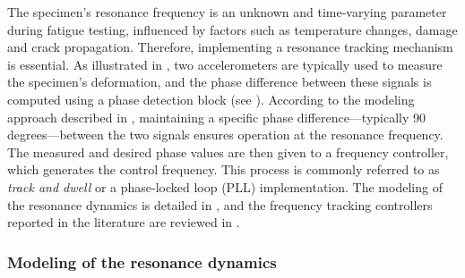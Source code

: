 \documentclass[lettersize,journal]{IEEEtran}
\begin{document}
The specimen’s resonance frequency is an unknown and time-varying parameter during fatigue testing, influenced by factors such as temperature changes, damage and crack propagation. Therefore, implementing a resonance tracking mechanism is essential. As illustrated in , two accelerometers are typically used to measure the specimen’s deformation, and the phase difference between these signals is computed using a phase detection block (see ). According to the modeling approach described in , maintaining a specific phase difference—typically 90 degrees—between the two signals ensures operation at the resonance frequency. The measured and desired phase values are then given to a frequency controller, which generates the control frequency. This process is commonly referred to as {\em track and dwell} or a phase-locked loop (PLL) implementation. The modeling of the resonance dynamics is detailed in , and the frequency tracking controllers reported in the literature are reviewed in .



\subsubsection{Modeling of the resonance dynamics} \label{S_resonance_modeling}
\end{document}
